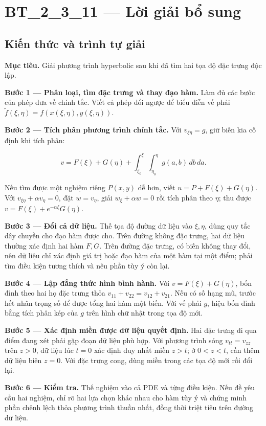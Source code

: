 \documentclass[10pt,a4paper]{article}
\begin{document}
\section*{BT\_2\_3\_11 — Lời giải bổ sung}
\subsection*{Kiến thức và trình tự giải}
\textbf{Mục tiêu.} Giải phương trình hyperbolic sau khi đã tìm hai tọa độ đặc trưng độc lập.

\textbf{Bước 1 — Phân loại, tìm đặc trưng và thay đạo hàm.} Làm đủ các bước của phép đưa về chính tắc. Viết cả phép đổi ngược để biểu diễn vế phải $\widetilde f(\xi,\eta)=f(x(\xi,\eta),y(\xi,\eta))$.

\textbf{Bước 2 — Tích phân phương trình chính tắc.} Với $v_{\xi\eta}=g$, giữ biến kia cố định khi tích phân:


\[
v=F(\xi)+G(\eta)+\int_{\xi_0}^{\xi}\int_{\eta_0}^{\eta}g(a,b)\,db\,da.
\]


Nếu tìm được một nghiệm riêng $P(x,y)$ dễ hơn, viết $u=P+F(\xi)+G(\eta)$. Với $v_{\xi\eta}+\alpha v_\eta=0$, đặt $w=v_\eta$, giải $w_\xi+\alpha w=0$ rồi tích phân theo $\eta$; thu được $v=F(\xi)+e^{-\alpha\xi}G(\eta)$.

\textbf{Bước 3 — Đổi cả dữ liệu.} Thế tọa độ đường dữ liệu vào $\xi,\eta$, dùng quy tắc dây chuyền cho đạo hàm được cho. Trên đường không đặc trưng, hai dữ liệu thường xác định hai hàm $F,G$. Trên đường đặc trưng, có biến không thay đổi, nên dữ liệu chỉ xác định giá trị hoặc đạo hàm của một hàm tại một điểm; phải tìm điều kiện tương thích và nêu phần tùy ý còn lại.

\textbf{Bước 4 — Lập đẳng thức hình bình hành.} Với $v=F(\xi)+G(\eta)$, bốn đỉnh theo hai họ đặc trưng thỏa $v_{11}+v_{22}=v_{12}+v_{21}$. Nếu có số hạng mũ, trước hết nhân trọng số để được tổng hai hàm một biến. Với vế phải $g$, hiệu bốn đỉnh bằng tích phân kép của $g$ trên hình chữ nhật trong tọa độ mới.

\textbf{Bước 5 — Xác định miền được dữ liệu quyết định.} Hai đặc trưng đi qua điểm đang xét phải gặp đoạn dữ liệu phù hợp. Với phương trình sóng $v_{tt}=v_{zz}$ trên $z>0$, dữ liệu lúc $t=0$ xác định duy nhất miền $z>t$; ở $0<z<t$, cần thêm dữ liệu biên $z=0$. Với đặc trưng cong, dùng miền trong các tọa độ mới rồi đổi lại.

\textbf{Bước 6 — Kiểm tra.} Thế nghiệm vào cả PDE và từng điều kiện. Nếu đề yêu cầu hai nghiệm, chỉ rõ hai lựa chọn khác nhau cho hàm tùy ý và chứng minh phần chênh lệch thỏa phương trình thuần nhất, đồng thời triệt tiêu trên đường dữ liệu.
\end{document}
